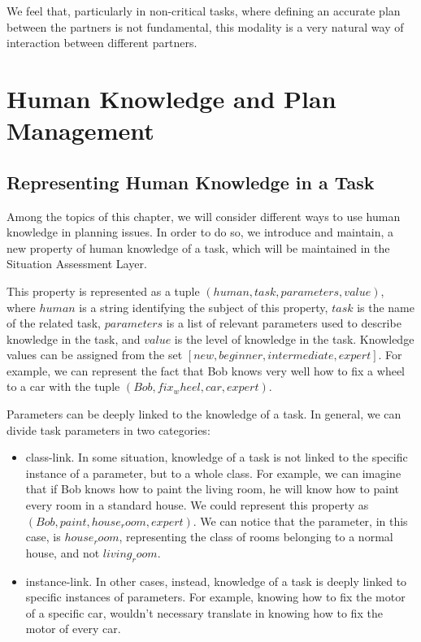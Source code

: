 We feel that, particularly in non-critical tasks, where defining an accurate plan between the partners is not
fundamental, this modality is a very natural way of
interaction between different partners.

\section{Human Knowledge and Plan Management}
\label{sec-plan_management-human_knowledge}
\subsection{Representing Human Knowledge in a Task}
Among the topics of this chapter, we will consider different ways to use human knowledge in planning issues. In order to do so, we introduce and maintain, a new property of human knowledge of a task, which will be maintained in the Situation Assessment Layer. 

This property is represented as a tuple $(human, task, parameters, value)$, where $human$ is a string identifying the subject of this property, $task$ is the name of the related task, $parameters$ is a list of relevant parameters used to describe knowledge in the task, and $value$ is the level of knowledge in the task. Knowledge values can be assigned from the set $[new, beginner, intermediate, expert]$.  For example, we can represent the fact that Bob knows very well how to fix a wheel to a car with the tuple $(Bob, fix_wheel, car, expert)$. 

Parameters can be deeply linked to the knowledge of a task. In general, we can divide task parameters in two categories:
\begin{itemize}
\item class-link. In some situation, knowledge of a task is not linked to the specific instance of a parameter, but to a whole class. For example, we can imagine that if Bob knows how to paint the living room, he will know how to paint every room in a standard house. We could represent this property as $(Bob, paint, house_room, expert)$. We can notice that the parameter, in this case, is $house_room$, representing the class of rooms belonging to a normal house, and not $living_room$.
\item instance-link. In other cases, instead, knowledge of a task is deeply linked to specific instances of parameters. For example, knowing how to fix the motor of a specific car, wouldn't necessary translate in knowing how to fix the motor of every car.
\end{itemize}

